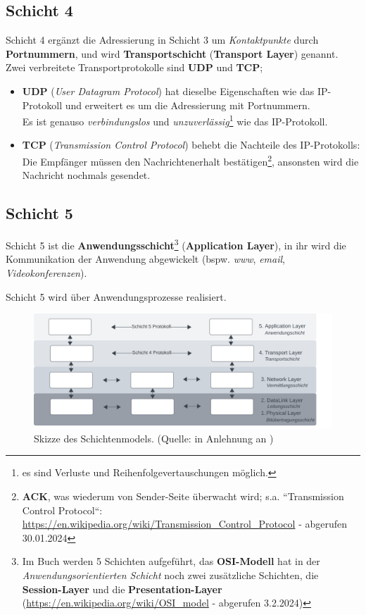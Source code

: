 \subsection*{Schicht 4}
Schicht 4 ergänzt die Adressierung in Schicht 3 um \textit{Kontaktpunkte} durch \textbf{Portnummern}, und wird \textbf{Transportschicht} (\textbf{Transport Layer}) genannt.\\

\noindent
Zwei verbreitete Transportprotokolle sind \textbf{UDP} und \textbf{TCP};

\begin{itemize}
    \item \textbf{UDP} (\textit{User Datagram Protocol}) hat dieselbe Eigenschaften wie das IP-Protokoll und erweitert es um die Adressierung mit Portnummern.\\
    Es ist genauso   \textit{verbindungslos} und \textit{unzuverlässig}\footnote{
    es sind Verluste und Reihenfolgevertauschungen möglich.
    } wie das IP-Protokoll.
    \item \textbf{TCP} (\textit{Transmission Control Protocol}) behebt die Nachteile des IP-Protokolls: Die Empfänger müssen den Nachrichtenerhalt bestätigen\footnote{ \textbf{ACK},
    was wiederum von Sender-Seite überwacht wird; s.a. ``Transmission Control Protocol``: \url{https://en.wikipedia.org/wiki/Transmission_Control_Protocol} - abgerufen 30.01.2024
    }, ansonsten wird die Nachricht nochmals gesendet.
\end{itemize}


\subsection*{Schicht 5}
Schicht 5 ist die \textbf{Anwendungsschicht}\footnote{
    Im Buch werden 5 Schichten aufgeführt, das \textbf{OSI-Modell} hat in der \textit{Anwendungsorientierten Schicht} noch zwei zusätzliche Schichten, die \textbf{Session-Layer} und die \textbf{Presentation-Layer} (\url{https://en.wikipedia.org/wiki/OSI_model} - abgerufen 3.2.2024)
} (\textbf{Application Layer}), in ihr wird die Kommunikation der Anwendung abgewickelt (bspw. \textit{www}, \textit{email}, \textit{Videokonferenzen}).


\begin{tcolorbox}
    Schicht 5 wird über Anwendungsprozesse realisiert.
\end{tcolorbox}


\begin{figure}
    \centering
    \includegraphics[width=16cm]{chapters/fopt5/img/layers}
    \caption{Skizze des Schichtenmodels. (Quelle: in Anlehnung an \cite[257, Bild 5.2]{Oec22})}
    \label{fig:layers}
\end{figure}


